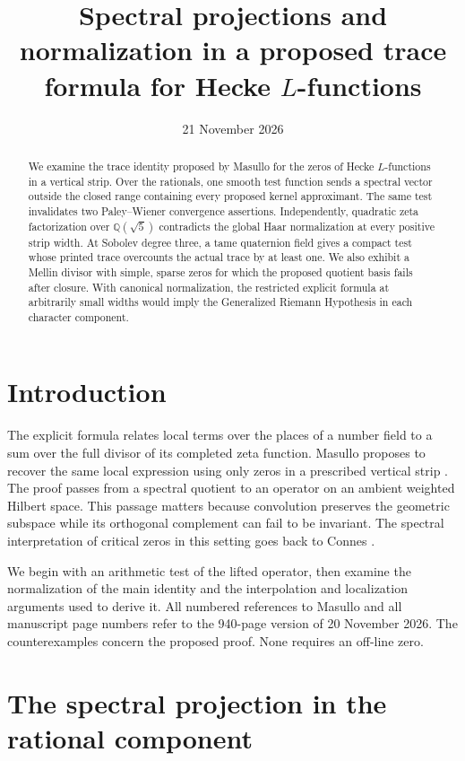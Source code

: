 \documentclass[11pt,reqno]{amsart}
\title[Spectral projections and a proposed trace formula]{Spectral projections and normalization in a proposed trace formula for Hecke \(L\)-functions}
\date{21 November 2026}
\numberwithin{equation}{section}
\begin{document}
\begin{abstract}
We examine the trace identity proposed by Masullo for the zeros of Hecke \(L\)-functions in a vertical strip. Over the rationals, one smooth test function sends a spectral vector outside the closed range containing every proposed kernel approximant. The same test invalidates two Paley--Wiener convergence assertions. Independently, quadratic zeta factorization over \(\mathbb Q(\sqrt5)\) contradicts the global Haar normalization at every positive strip width. At Sobolev degree three, a tame quaternion field gives a compact test whose printed trace overcounts the actual trace by at least one. We also exhibit a Mellin divisor with simple, sparse zeros for which the proposed quotient basis fails after closure. With canonical normalization, the restricted explicit formula at arbitrarily small widths would imply the Generalized Riemann Hypothesis in each character component.
\end{abstract}
\maketitle
\section{Introduction}
The explicit formula relates local terms over the places of a number field to a sum over the full divisor of its completed zeta function. Masullo proposes to recover the same local expression using only zeros in a prescribed vertical strip \cite{masullo}. The proof passes from a spectral quotient to an operator on an ambient weighted Hilbert space. This passage matters because convolution preserves the geometric subspace while its orthogonal complement can fail to be invariant. The spectral interpretation of critical zeros in this setting goes back to Connes \cite{connes}.

We begin with an arithmetic test of the lifted operator, then examine the normalization of the main identity and the interpolation and localization arguments used to derive it. All numbered references to Masullo and all manuscript page numbers refer to the 940-page version of 20 November 2026. The counterexamples concern the proposed proof. None requires an off-line zero.

\section{The spectral projection in the rational component}
\end{document}
